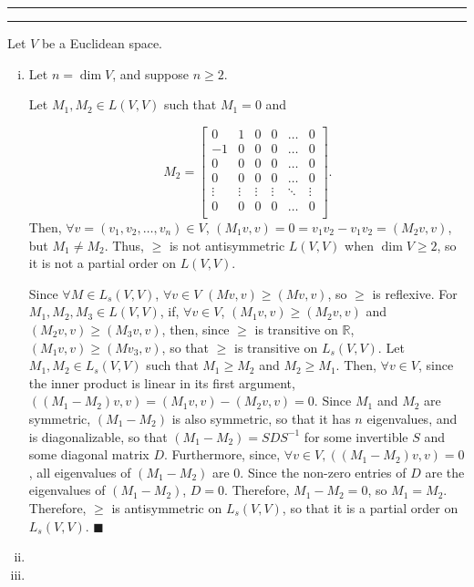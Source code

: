 \documentclass[11pt]{article}
\newcounter{questionCounter}
\newcounter{partCounter}[questionCounter]
\newenvironment{question}[2][\arabic{questionCounter}]{%
    \setcounter{partCounter}{0}%
    \vspace{.25in} \hrule \vspace{0.5em}%
        \noindent{\bf #2}%
    \vspace{0.8em} \hrule \vspace{.10in}%
    \addtocounter{questionCounter}{1}%
}{}
\begin{document}
\begin{question}{Exercise 12} Let $V$ be a Euclidean space.
\begin{enumerate}[i)]
\item Let $n = \dim V$, and suppose $n \geq 2$.

Let $M_1, M_2 \in L(V,V)$ such that $M_1 = 0$ and

\[M_2 =
\begin{bmatrix}
   0   &    1   &    0   &    0   & \ldots &    0   \\
  -1   &    0   &    0   &    0   & \ldots &    0   \\
   0   &    0   &    0   &    0   & \ldots &    0   \\
   0   &    0   &    0   &    0   & \ldots &    0   \\
\vdots & \vdots & \vdots & \vdots & \ddots & \vdots \\
   0   &    0   &    0   &    0   & \ldots &    0   \\
\end{bmatrix}.\]
Then, $\forall v = (v_1,v_2,\ldots,v_n) \in V$,
$(M_1v,v) = 0 = v_1v_2 - v_1v_2 = (M_2v,v)$, but $M_1 \neq M_2$. Thus, $\geq$
is not antisymmetric $L(V,V)$ when $\dim V \geq 2$, so it is not a partial
order on $L(V,V)$.

Since $\forall M \in L_s(V,V)$, $\forall v \in V$ $(Mv,v) \geq (Mv,v)$, so
$\geq$ is reflexive. For $M_1,M_2,M_3 \in L(V,V)$, if, $\forall v \in V$,
$(M_1v,v) \geq (M_2v,v)$ and $(M_2v,v) \geq (M_3v,v)$, then, since $\geq$ is
transitive on $\mathbb{R}$, $(M_1v,v) \geq (Mv_3,v)$, so that $\geq$ is
transitive on $L_s(V,V)$. Let $M_1,M_2 \in L_s(V,V)$ such that $M_1 \geq M_2$
and $M_2 \geq M_1$. Then, $\forall v \in V$, since the inner product is linear
in its first argument, $((M_1 - M_2)v,v) = (M_1v,v) - (M_2v,v) = 0$. Since
$M_1$ and $M_2$ are symmetric, $(M_1 - M_2)$ is also symmetric, so that it has
$n$ eigenvalues, and is diagonalizable, so that $(M_1 - M_2) = SDS^{-1}$ for
some invertible $S$ and some diagonal matrix $D$. Furthermore, since,
$\forall v \in V, ((M_1 - M_2)v,v) = 0$, all eigenvalues of $(M_1 - M_2)$ are
$0$. Since the non-zero entries of $D$ are the eigenvalues of $(M_1 - M_2)$,
$D = 0$. Therefore, $M_1 - M_2 = 0$, so $M_1 = M_2$. Therefore, $\geq$ is
antisymmetric on $L_s(V,V)$, so that it is a partial order on $L_s(V,V)$.
\qquad $\blacksquare$

\item

\item
\end{enumerate}
\end{question}
\end{document}
